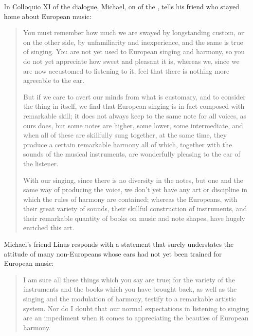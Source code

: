 In Colloquio XI of the dialogue, Michael, on of the , 
tells his friend who stayed home about European music:
\begin{quotation}
    You must remember \Dots{} how much we are swayed by longstanding custom, or 
    on the other side, by unfamiliarity and inexperience, and the same is true of 
    singing. 
    You are not yet used to European singing and harmony, so you do not yet 
    appreciate how sweet and pleasant it is, whereas we, since we are now 
    accustomed to listening to it, feel that there is nothing more agreeable to the 
    ear.

    But if we care to avert our minds from what is customary, and to consider 
    the thing in itself, we find that European singing is in fact composed with 
    remarkable skill; it does not always keep to the same note for all voices, as 
    ours does, but some notes are higher, some lower, some intermediate, and when 
    all of these are skillfully sung together, at the same time, they produce a 
    certain remarkable harmony \Dots{} all of which, \Dots{} together with the 
    sounds of the musical instruments, are wonderfully pleasing to the ear of the 
    listener. \Dots{}

    With our singing, since there is no diversity in the notes, but one and the 
    same way of producing the voice, we don't yet have any art or discipline in 
    which the rules of harmony are contained; whereas the Europeans, with their 
    great variety of sounds, their skillful construction of instruments, and their 
    remarkable quantity of books on music and note shapes, have hugely enriched 
    this art.%
         \Autocite[155-156]{Massarella:JapaneseTravellers}
\end{quotation}
Michael's friend Linus responds with a statement that surely understates the 
attitude of many non-Europeans whose ears had not yet been trained for European 
music:
\begin{quote}
    I am sure all these things which you say are true; for the variety of the 
    instruments and the books which you have brought back, as well as the singing 
    and the modulation of harmony, testify to a remarkable artistic system.
    Nor do I doubt that our normal expectations in listening to singing are an 
    impediment when it comes to appreciating the beauties of European harmony.%
         \Autocite[156]{Massarella:JapaneseTravellers}
\end{quote}


